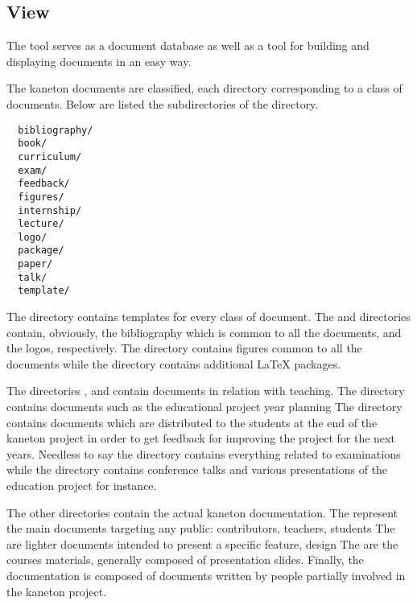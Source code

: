 %
%
%
%
%
%

%
%

\subsection{View}
\label{section:view}

The  tool serves as a document database as well as a tool for
building and displaying documents in an easy way.

The kaneton documents are classified, each directory corresponding to a
class of documents. Below are listed the subdirectories of the 
directory.

\begin{verbatim}
  bibliography/
  book/
  curriculum/
  exam/
  feedback/
  figures/
  internship/
  lecture/
  logo/
  package/
  paper/
  talk/
  template/
\end{verbatim}

The  directory contains templates for every class of
document. The  and  directories
contain, obviously, the bibliography which is common to all the documents, and
the logos, respectively. The  directory contains figures
common to all the documents while the  directory contains
additional {\LaTeX} packages.

The directories ,  and
 contain documents in relation with teaching. The
 directory contains documents such as the educational
project year planning \etc{} The  directory contains
documents which are distributed to the students at the end of the kaneton
project in order to get feedback for improving the project for the next years.
Needless to say the  directory contains everything related to
examinations while the  directory contains conference talks
and various presentations of the education project for instance.

The other directories contain the actual kaneton documentation. The
 represent the main documents targeting any public:
contributors, teachers, students \etc{} The  are lighter
documents intended to present a specific feature, design \etc{} The
 are the courses materials, generally composed of
presentation slides. Finally, the  documentation is
composed of documents written by people partially involved in the kaneton
project.

